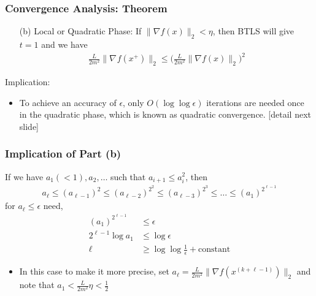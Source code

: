 \documentclass{beamer}
\begin{document}
\begin{frame}
    \frametitle{Convergence Analysis: Theorem}    
    \begin{theorem}[Part II]
        \begin{itemize}
            \item[(b)] Local or Quadratic Phase: If $\|\nabla f(x)\|_2 < \eta$,
                then BTLS will give $t = 1$ and we have
                \begin{align}
                    \frac{L}{2m^2} \|\nabla_{}f(x^{+})\|_2 \leq 
                    \bigg(\frac{L}{2m^2} \|\nabla f(x)\|_2 \bigg)^2
                \end{align}
        \end{itemize}
    \end{theorem}
    Implication:
    \begin{itemize}
    \item To achieve an accuracy of $\epsilon$, only $O(\log \log \epsilon)$ iterations are needed once in the quadratic phase, which is known as quadratic convergence. [detail next slide]
    \end{itemize}
\end{frame}

\begin{frame}
	\frametitle{Implication of Part (b)}
	If we have $a_1 (<1), a_2,\dots$ such that $a_{i+1}\le a_{i}^2$, then
	\begin{align*}
	a_\ell \le (a_{\ell-1})^2 \le (a_{\ell-2})^{2^2} \le (a_{\ell-3})^{2^{3}} \le \dots \le (a_{1})^{2^{\ell-1}}
	\end{align*}
	for $a_\ell \le \epsilon$ need,
	\begin{align*}
	(a_{1})^{2^{\ell-1}} & \le \epsilon 
	\\  2^{\ell-1} \log a_1 & \le \log \epsilon
	\\   \ell  & \ge \log \log \frac{1}{\epsilon} + \text{constant}
	\end{align*}
	\begin{itemize}
	\item In this case to make it more precise, set $a_\ell = \frac{L}{2m^2} \|\nabla f(x^{(k+\ell - 1)}) \|_2$ and note that $a_1 < \frac{L}{2m^2}\eta < \frac{1}{2}$
	\end{itemize} 
\end{frame}
\end{document}
